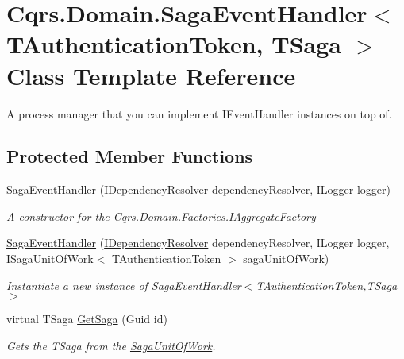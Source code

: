 \hypertarget{classCqrs_1_1Domain_1_1SagaEventHandler}{}\section{Cqrs.\+Domain.\+Saga\+Event\+Handler$<$ T\+Authentication\+Token, T\+Saga $>$ Class Template Reference}
\label{classCqrs_1_1Domain_1_1SagaEventHandler}


A process manager that you can implement I\+Event\+Handler instances on top of.  


\subsection*{Protected Member Functions}
\begin{DoxyCompactItemize}
\item 
\hyperlink{classCqrs_1_1Domain_1_1SagaEventHandler_a4ad68643dd845330a96c71039cf0897f_a4ad68643dd845330a96c71039cf0897f}{Saga\+Event\+Handler} (\hyperlink{interfaceCqrs_1_1Configuration_1_1IDependencyResolver}{I\+Dependency\+Resolver} dependency\+Resolver, I\+Logger logger)
\begin{DoxyCompactList}\small\item\em A constructor for the \hyperlink{interfaceCqrs_1_1Domain_1_1Factories_1_1IAggregateFactory}{Cqrs.\+Domain.\+Factories.\+I\+Aggregate\+Factory} \end{DoxyCompactList}\item 
\hyperlink{classCqrs_1_1Domain_1_1SagaEventHandler_a061ebe3676b158d952b26629195df627_a061ebe3676b158d952b26629195df627}{Saga\+Event\+Handler} (\hyperlink{interfaceCqrs_1_1Configuration_1_1IDependencyResolver}{I\+Dependency\+Resolver} dependency\+Resolver, I\+Logger logger, \hyperlink{interfaceCqrs_1_1Domain_1_1ISagaUnitOfWork}{I\+Saga\+Unit\+Of\+Work}$<$ T\+Authentication\+Token $>$ saga\+Unit\+Of\+Work)
\begin{DoxyCompactList}\small\item\em Instantiate a new instance of \hyperlink{classCqrs_1_1Domain_1_1SagaEventHandler_a4ad68643dd845330a96c71039cf0897f_a4ad68643dd845330a96c71039cf0897f}{Saga\+Event\+Handler$<$\+T\+Authentication\+Token,\+T\+Saga$>$} \end{DoxyCompactList}\item 
virtual T\+Saga \hyperlink{classCqrs_1_1Domain_1_1SagaEventHandler_ad3ef0b5067004d4930c45a6585f54764_ad3ef0b5067004d4930c45a6585f54764}{Get\+Saga} (Guid id)
\begin{DoxyCompactList}\small\item\em Gets the {\itshape T\+Saga}  from the \hyperlink{classCqrs_1_1Domain_1_1SagaUnitOfWork}{Saga\+Unit\+Of\+Work}. \end{DoxyCompactList}\end{DoxyCompactItemize}
